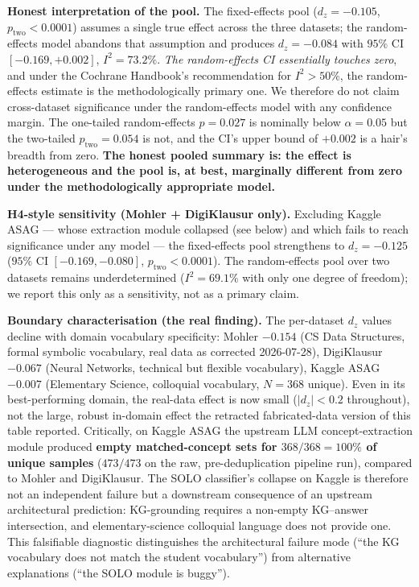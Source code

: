 \documentclass[conference]{IEEEtran}
\begin{document}
\textbf{Honest interpretation of the pool.} The fixed-effects pool
($d_z = -0.105$, $p_{\text{two}} < 0.0001$) assumes a single true effect
across the three datasets; the random-effects model abandons that assumption
and produces $d_z = -0.084$ with $95\%$ CI $[-0.169, +0.002]$, $I^2 = 73.2\%$.
\emph{The random-effects CI essentially touches zero}, and under the Cochrane
Handbook's recommendation for $I^2 > 50\%$, the random-effects estimate is
the methodologically primary one. We therefore do not claim cross-dataset
significance under the random-effects model with any confidence margin.
The one-tailed random-effects $p = 0.027$ is nominally below $\alpha=0.05$
but the two-tailed $p_{\text{two}} = 0.054$ is not, and the CI's upper
bound of $+0.002$ is a hair's breadth from zero. \textbf{The
honest pooled summary is: the effect is heterogeneous and the pool is, at
best, marginally different from zero under the methodologically appropriate
model.}

\textbf{H4-style sensitivity (Mohler + DigiKlausur only).} Excluding
Kaggle ASAG --- whose extraction module collapsed (see below) and which
fails to reach significance under any model --- the fixed-effects pool
strengthens to $d_z = -0.125$ ($95\%$ CI $[-0.169, -0.080]$,
$p_{\text{two}} < 0.0001$). The random-effects pool over two datasets
remains underdetermined ($I^2 = 69.1\%$ with only one degree of freedom);
we report this only as a sensitivity, not as a primary claim.

\textbf{Boundary characterisation (the real finding).} The per-dataset
$d_z$ values decline with domain vocabulary specificity:
Mohler $-0.154$ (CS Data Structures, formal symbolic vocabulary, real
data as corrected 2026-07-28),
DigiKlausur $-0.067$ (Neural Networks, technical but flexible vocabulary),
Kaggle ASAG $-0.007$ (Elementary Science, colloquial vocabulary,
$N=368$ unique). Even in its best-performing domain, the real-data effect
is now small ($|d_z|<0.2$ throughout), not the large, robust in-domain
effect the retracted fabricated-data version of this table reported.
Critically, on Kaggle ASAG the upstream LLM concept-extraction module
produced \textbf{empty matched-concept sets for $368/368 = 100\%$ of
unique samples} ($473/473$ on the raw, pre-deduplication pipeline run),
compared to Mohler and DigiKlausur. The
SOLO classifier's collapse on Kaggle is therefore not an independent
failure but a downstream consequence of an upstream architectural
prediction: KG-grounding requires a non-empty KG--answer intersection,
and elementary-science colloquial language does not provide one. This
falsifiable diagnostic distinguishes the architectural failure mode
(``the KG vocabulary does not match the student vocabulary'') from
alternative explanations (``the SOLO module is buggy'').
\end{document}
